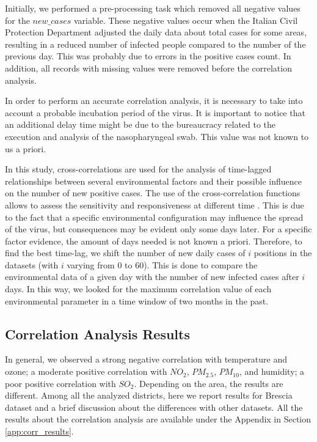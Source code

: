 \documentclass[review]{elsarticle}
\begin{document}

Initially, we performed a pre-processing task which removed all negative values for the $new\_cases$ variable. These negative values occur when the Italian Civil Protection Department adjusted the daily data about total cases for some areas, resulting in a reduced  number of infected people compared to the number of the previous day. This was probably due to errors in the positive cases count. In addition, all records with missing values were removed before the correlation analysis.

In order to perform an accurate correlation analysis, it is necessary to take into account a probable incubation period of the virus. It is important to notice that an additional delay time might be due to the bureaucracy related to the execution and analysis of the nasopharyngeal swab. This value was not known to us a priori. 

In this study, cross-correlations are used for the analysis of time-lagged relationships between several environmental factors and their possible influence on the number of new positive cases. The use of the cross-correlation functions allows to assess the sensitivity and responsiveness at different time \cite{derrick2004time}. This is due to the fact that a specific environmental configuration may influence the spread of the virus, but consequences may be evident only some days later.  For a specific factor evidence, the amount of days needed is not known a priori.
Therefore, to find the best time-lag, we shift the number of new daily cases of $i$ positions in the datasets (with $i$ varying from $0$ to $60$). This is done to compare the environmental data of a given day with the number of new infected cases after $i$ days. In this way, we looked for the maximum correlation value of each environmental parameter in a time window of two months in the past.

\subsection{Correlation Analysis Results}
In general, we observed a strong negative correlation with temperature and ozone; a moderate positive correlation with $NO_{2}$, $PM_{2.5}$,  $PM_{10}$, and humidity; a poor positive correlation with $SO_{2}$. Depending on the area, the results are different.
%
Among all the analyzed districts, here we report results for Brescia dataset and a brief discussion about the differences with other datasets. All the results about the correlation analysis are available under the Appendix in Section \ref{app:corr_results}.
\end{document}
